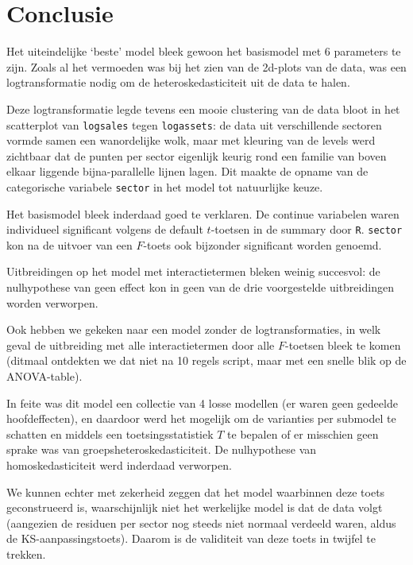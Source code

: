 \documentclass[a4paper]{report}
\begin{document}
\chapter{Conclusie}

  Het uiteindelijke `beste' model bleek gewoon het basismodel met 6 parameters te zijn. Zoals al het vermoeden was bij het zien van de 2d-plots van de data, was een logtransformatie nodig om de heteroskedasticiteit uit de data te halen.
  
  Deze logtransformatie legde tevens een mooie clustering van de data bloot in het scatterplot van \verb!logsales! tegen \verb!logassets!: de data uit verschillende sectoren vormde samen een wanordelijke wolk, maar met kleuring van de levels werd zichtbaar dat de punten per sector eigenlijk keurig rond een familie van boven elkaar liggende bijna-parallelle lijnen lagen. Dit maakte de opname van de categorische variabele \verb!sector! in het model tot natuurlijke keuze. 
  
  Het basismodel bleek inderdaad goed te verklaren. De continue variabelen waren individueel significant volgens de default $t$-toetsen in de summary door \verb!R!. \verb!sector! kon na de uitvoer van een $F$-toets ook bijzonder significant worden genoemd.
  
  Uitbreidingen op het model met interactietermen bleken weinig succesvol: de nulhypothese van geen effect kon in geen van de drie voorgestelde uitbreidingen worden verworpen. 
  
  Ook hebben we gekeken naar een model zonder de logtransformaties, in welk geval de uitbreiding met alle interactietermen door alle $F$-toetsen bleek te komen (ditmaal ontdekten we dat niet na 10 regels script, maar met een snelle blik op de ANOVA-table).
  
  In feite was dit model een collectie van 4 losse modellen (er waren geen gedeelde hoofdeffecten), en daardoor werd het mogelijk om de varianties per submodel te schatten en middels een toetsingsstatistiek $T$ te bepalen of er misschien geen sprake was van groepsheteroskedasticiteit. De nulhypothese van homoskedasticiteit werd inderdaad verworpen. 
  
  We kunnen echter met zekerheid zeggen dat het model waarbinnen deze toets geconstrueerd is, waarschijnlijk niet het werkelijke model is dat de data volgt (aangezien de residuen per sector nog steeds niet normaal verdeeld waren, aldus de KS-aanpassingstoets). Daarom is de validiteit van deze toets in twijfel te trekken.
  
\end{document}
